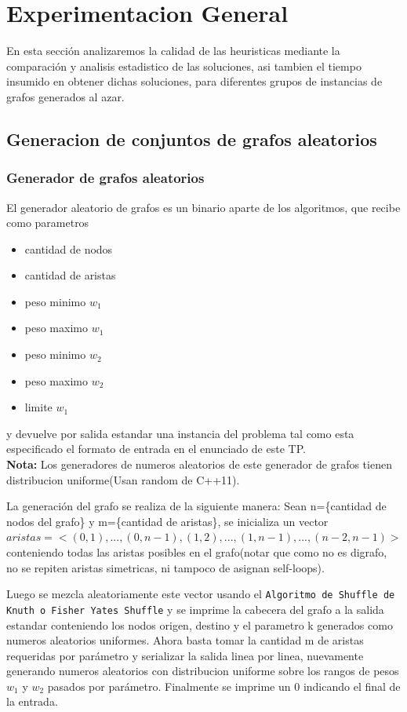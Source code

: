 \section{Experimentacion General}
En esta secci\'on analizaremos la calidad de las heuristicas mediante la comparaci\'on y analisis estadistico de las soluciones, asi tambien el tiempo insumido en obtener dichas soluciones, para diferentes grupos de instancias de grafos generados al azar.

\subsection{Generacion de conjuntos de grafos aleatorios}

\subsubsection{Generador de grafos aleatorios}
El generador aleatorio de grafos es un binario aparte de los algoritmos, que recibe como parametros
\begin{itemize}
\item cantidad de nodos
\item cantidad de aristas
\item peso minimo $w_1$
\item peso maximo $w_1$
\item peso minimo $w_2$
\item peso maximo $w_2$
\item limite $w_1$
\end{itemize}
y devuelve por salida estandar una instancia del problema tal como esta especificado el formato de entrada en el enunciado de este TP.\\
\textbf{Nota: }Los generadores de numeros aleatorios de este generador de grafos tienen distribucion uniforme(Usan random de C++11).

\vspace{1cm}

La generaci\'on del grafo se realiza de la siguiente manera: 
Sean n=\{cantidad de nodos del grafo\} y m=\{cantidad de aristas\}, se inicializa un vector $aristas =  <(0, 1), ..., (0, n-1), (1, 2), ..., (1, n-1), ..., (n - 2, n-1)>$ conteniendo todas las aristas posibles en el grafo(notar que como no es digrafo, no se repiten aristas simetricas, ni tampoco de asignan self-loops).

\vspace{1cm}

Luego se mezcla aleatoriamente este vector usando el \texttt{Algoritmo de Shuffle de Knuth o Fisher Yates Shuffle} y se imprime la cabecera del grafo a la salida estandar conteniendo los nodos origen, destino y el parametro k generados como numeros aleatorios uniformes. Ahora basta tomar la cantidad m de aristas requeridas por par\'ametro y serializar la salida linea por linea, nuevamente generando numeros aleatorios con distribucion uniforme sobre los rangos de pesos $w_1$ y $w_2$ pasados por par\'ametro. Finalmente se imprime un 0 indicando el final de la entrada.

